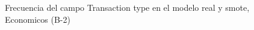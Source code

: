 \begin{figure}[H]
    \centering
    
    \caption{Frecuencia del campo Transaction type en el modelo real y smote, Economicos (B-2)}
    \label{frecuency-Transaction Type-smote-enc}
\end{figure}